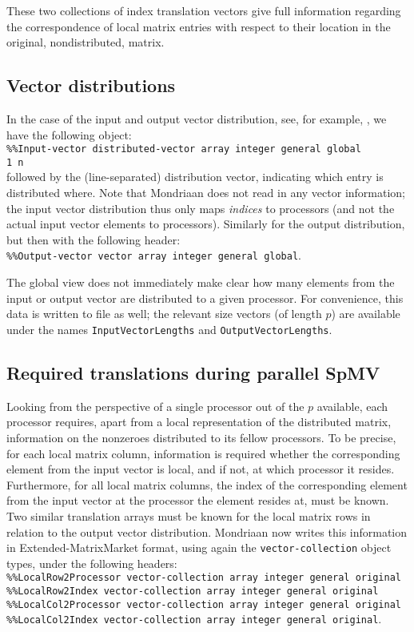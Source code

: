 \documentclass[final]{amsart}
\begin{document}
These two collections of index translation vectors give full information
regarding the correspondence of local matrix entries with respect to 
their location in the original, nondistributed, matrix.

\subsection{Vector distributions}

In the case of the input and output vector distribution,
see, for example, \cite{vector},
we have the following object:\\
\verb|%%Input-vector distributed-vector array integer general global|\\
\verb|1 n|\\
followed by the (line-separated) distribution vector,
indicating which entry is distributed where.
Note that Mondriaan does not read in any vector information;
the input vector distribution thus only maps \emph{indices} to processors
(and not the actual input vector elements to processors).
Similarly for the output distribution, but then with the following header:\\
\verb|%%Output-vector vector array integer general global|.

The global view does not immediately make clear how many elements from the
input or output vector are distributed to a given processor.
For convenience,
this data is written to file as well;
the relevant size vectors (of length $p$) are available under the names
\verb|InputVectorLengths| and \verb|OutputVectorLengths|.

\subsection{Required translations during parallel SpMV}

Looking from the perspective of a single processor out of the $p$ available,
each processor requires,
apart from a local representation of the distributed matrix,
information on the nonzeroes distributed to its fellow processors.
To be precise,
for each local matrix column,
information is required whether the corresponding element from the input vector
is local, and if not, at which processor it resides.
Furthermore, for all local matrix columns,
the index of the corresponding element from the input vector at the processor the element resides at, must be known.
Two similar translation arrays must be known for the local matrix rows
in relation to the output vector distribution.
Mondriaan now writes this information in Extended-MatrixMarket format,
using again the \verb|vector-collection| object types,
under the following headers:\\
\verb|%%LocalRow2Processor vector-collection array integer general original|\\
\verb|%%LocalRow2Index vector-collection array integer general original|\\
\verb|%%LocalCol2Processor vector-collection array integer general original|\\
\verb|%%LocalCol2Index vector-collection array integer general original|.
\end{document}
